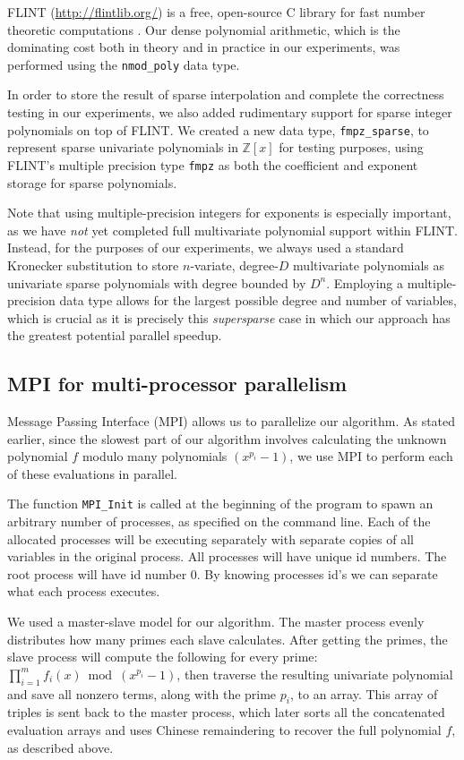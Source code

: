 \documentclass[letterpaper,10pt]{article}
\def\cite{\citep}
\newcommand{\ZZ}{\ensuremath{\mathbb{Z}}}
\begin{document}
FLINT (\url{http://flintlib.org/}) is a free, open-source C library for
fast number theoretic computations \cite{flint}. Our dense polynomial
arithmetic, which is the dominating cost both in theory and in practice
in our experiments, was performed using the \verb|nmod_poly| data type.

In order to store the result of sparse interpolation and complete the
correctness testing in our experiments, we also added rudimentary
support for sparse integer polynomials on top of FLINT. We created a new
data type, \verb|fmpz_sparse|, to represent sparse univariate
polynomials in $\ZZ[x]$ for testing purposes, using FLINT's multiple
precision type \verb|fmpz| as both the coefficient and exponent storage
for sparse polynomials. 

Note that using multiple-precision integers for
exponents is especially important, as we have \emph{not} yet completed
full multivariate polynomial support within FLINT. Instead, for the
purposes of our experiments, we always used a standard Kronecker
substitution to store $n$-variate, degree-$D$ 
multivariate polynomials as univariate sparse
polynomials with degree bounded by $D^n$. Employing a multiple-precision
data type allows for the largest possible degree and number of
variables, which is crucial as it is precisely this \emph{supersparse}
case in which our approach has the greatest potential parallel speedup.

\subsection{MPI for multi-processor parallelism}
 Message Passing Interface (MPI) allows us to parallelize our algorithm. 
 As stated earlier, since the slowest part of our algorithm involves calculating 
 the unknown polynomial $f$ modulo many polynomials $(x^{p_i}-1)$, we
 use MPI to perform each of these evaluations in parallel.

 The function \verb|MPI_Init|
 is called at the beginning of the program to spawn an arbitrary number
 of processes, as specified on the command line.
 Each of the allocated processes will be
 executing separately with separate copies of all variables in the original 
 process. All processes will have unique id numbers. The root process
 will have id number 0. By knowing processes id's we can separate what each
 process executes. 
 
 We used a master-slave model for our algorithm. The master 
 process evenly distributes how many primes each slave calculates. After getting 
 the primes, the slave process will compute the following for every prime:
 $\prod_{i=1}^{m} f_i(x) \bmod (x^{p_i}-1)$, then
 traverse the resulting univariate polynomial 
 and save all nonzero terms, along with the prime $p_i$, to an array.
 This array of triples is sent back to the master process, which later
 sorts all the concatenated evaluation arrays
 and uses Chinese remaindering to recover the full polynomial
 $f$, as described above.
\end{document}
